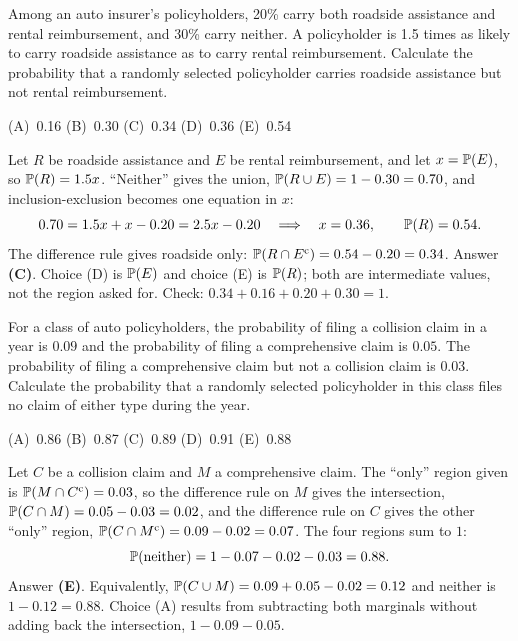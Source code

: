 \begin{example}
Among an auto insurer's policyholders, 20\% carry both roadside assistance and rental
reimbursement, and 30\% carry neither. A policyholder is 1.5 times as likely to carry roadside
assistance as to carry rental reimbursement.
Calculate the probability that a randomly selected policyholder carries roadside assistance but not
rental reimbursement.
\par\smallskip\noindent (A)~0.16 \qquad (B)~0.30 \qquad (C)~0.34 \qquad (D)~0.36 \qquad (E)~0.54
\end{example}
\begin{solution}
Let $R$ be roadside assistance and $E$ be rental reimbursement, and let $x = \mathbb{P}(E)$, so
$\mathbb{P}(R) = 1.5x$. ``Neither'' gives the union, $\mathbb{P}(R \cup E) = 1 - 0.30 = 0.70$, and
inclusion-exclusion becomes one equation in $x$:
\[
0.70 = 1.5x + x - 0.20 = 2.5x - 0.20 \quad\Longrightarrow\quad x = 0.36, \qquad \mathbb{P}(R) = 0.54.
\]
The difference rule gives roadside only: $\mathbb{P}(R \cap E^{\mathrm{c}}) = 0.54 - 0.20 = 0.34$.
Answer \textbf{(C)}. Choice (D) is $\mathbb{P}(E)$ and choice (E) is $\mathbb{P}(R)$; both are intermediate
values, not the region asked for. Check: $0.34 + 0.16 + 0.20 + 0.30 = 1$.
\end{solution}

\begin{example}
For a class of auto policyholders, the probability of filing a collision claim in a year is
$0.09$ and the probability of filing a comprehensive claim is $0.05$. The probability of filing a
comprehensive claim but not a collision claim is $0.03$.
Calculate the probability that a randomly selected policyholder in this class files no claim of
either type during the year.
\par\smallskip\noindent (A)~0.86 \qquad (B)~0.87 \qquad (C)~0.89 \qquad (D)~0.91 \qquad (E)~0.88
\end{example}
\begin{solution}
Let $C$ be a collision claim and $M$ a comprehensive claim. The ``only'' region given is
$\mathbb{P}(M \cap C^{\mathrm{c}}) = 0.03$, so the difference rule on $M$ gives the intersection,
$\mathbb{P}(C \cap M) = 0.05 - 0.03 = 0.02$, and the difference rule on $C$ gives the other ``only''
region, $\mathbb{P}(C \cap M^{\mathrm{c}}) = 0.09 - 0.02 = 0.07$. The four regions sum to $1$:
\[
\mathbb{P}(\text{neither}) = 1 - 0.07 - 0.02 - 0.03 = 0.88.
\]
Answer \textbf{(E)}. Equivalently, $\mathbb{P}(C \cup M) = 0.09 + 0.05 - 0.02 = 0.12$ and neither is
$1 - 0.12 = 0.88$. Choice (A) results from subtracting both marginals without adding back the
intersection, $1 - 0.09 - 0.05$.
\end{solution}

